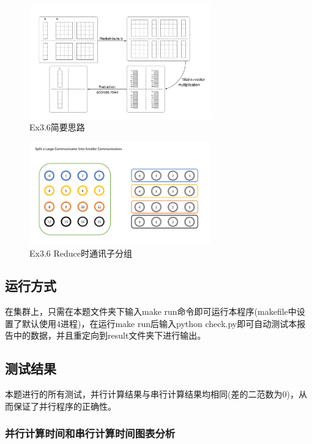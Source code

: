 \documentclass[UTF8]{article}
\begin{document}
\begin{figure}[h]
    \centering
    \includegraphics[width=0.7\textwidth]{cb.png}
    \caption{Ex3.6简要思路}
\end{figure}

\begin{figure}[h]
    \centering
    \includegraphics[width=0.7\textwidth]{comm_split.png}
    \caption{Ex3.6 Reduce时通讯子分组}
\end{figure}

\subsection{运行方式}
在集群上，只需在本题文件夹下输入make run命令即可运行本程序(makefile中设置了默认使用4进程)，在运行make run后输入python check.py即可自动测试本报告中的数据，并且重定向到result文件夹下进行输出。
\clearpage


\subsection{测试结果}
本题进行的所有测试，并行计算结果与串行计算结果均相同(差的二范数为0)，从而保证了并行程序的正确性。

\subsubsection{并行计算时间和串行计算时间图表分析}
\end{document}
